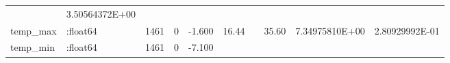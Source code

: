 \documentclass[]{article}
\begin{document}
\begin{longtable}[]{@{}llllllllll@{}}
\begin{minipage}[t]{0.11\columnwidth}
\end{minipage} & \begin{minipage}[t]{0.09\columnwidth}\raggedright
3.50564372E+00\strut
\end{minipage}\tabularnewline
\begin{minipage}[t]{0.08\columnwidth}\raggedright
temp\_max\strut
\end{minipage} & \begin{minipage}[t]{0.11\columnwidth}\raggedright
:float64\strut
\end{minipage} & \begin{minipage}[t]{0.05\columnwidth}\raggedright
1461\strut
\end{minipage} & \begin{minipage}[t]{0.06\columnwidth}\raggedright
0\strut
\end{minipage} & \begin{minipage}[t]{0.06\columnwidth}\raggedright
-1.600\strut
\end{minipage} & \begin{minipage}[t]{0.06\columnwidth}\raggedright
16.44\strut
\end{minipage} & \begin{minipage}[t]{0.04\columnwidth}\raggedright
\strut
\end{minipage} & \begin{minipage}[t]{0.06\columnwidth}\raggedright
35.60\strut
\end{minipage} & \begin{minipage}[t]{0.11\columnwidth}\raggedright
7.34975810E+00\strut
\end{minipage} & \begin{minipage}[t]{0.09\columnwidth}\raggedright
2.80929992E-01\strut
\end{minipage}\tabularnewline
\begin{minipage}[t]{0.08\columnwidth}\raggedright
temp\_min\strut
\end{minipage} & \begin{minipage}[t]{0.11\columnwidth}\raggedright
:float64\strut
\end{minipage} & \begin{minipage}[t]{0.05\columnwidth}\raggedright
1461\strut
\end{minipage} & \begin{minipage}[t]{0.06\columnwidth}\raggedright
0\strut
\end{minipage} & \begin{minipage}[t]{0.06\columnwidth}\raggedright
-7.100\strut
\end{minipage} & \begin{minipage}[t]{0.06\columnwidth}\raggedright

\end{minipage}
\end{longtable}
\end{document}

